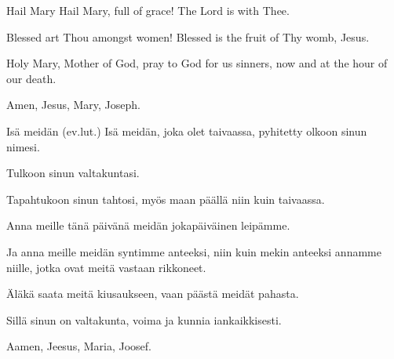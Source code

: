   \begin{passage}[EN]{Hail Mary}
    Hail Mary,
    full of grace!
    The Lord is with Thee.
    \par
    Blessed art Thou amongst women!
    Blessed is the fruit of Thy womb, Jesus.
    \par
    Holy Mary, Mother of God,
    pray to God for us sinners,
    now and at the hour of our death.
    \par
    Amen, Jesus, Mary, Joseph.
  \end{passage}
  \vspace{\fill}
  \hardbrk
  \vspace*{1ex} %
  \begin{passage}[FI]{Isä meidän {\scriptsize(ev.lut.)}}
    Isä meidän, joka olet taivaassa,
    pyhitetty olkoon sinun nimesi.
    \par
    Tulkoon sinun valtakuntasi.
    \par
    Tapahtukoon sinun tahtosi,
    myös maan päällä niin kuin taivaassa.
    \par
    Anna meille tänä päivänä
    meidän jokapäiväinen leipämme.
    \par
    Ja anna meille meidän syntimme anteeksi,
    niin kuin mekin anteeksi annamme niille,
    jotka ovat meitä vastaan rikkoneet.
    \par
    Äläkä saata meitä kiusaukseen,
    vaan päästä meidät pahasta.
    \par
    Sillä sinun on valtakunta,
    voima ja kunnia iankaikkisesti.
    \par
    Aamen, Jeesus, Maria, Joosef.
  \end{passage}

